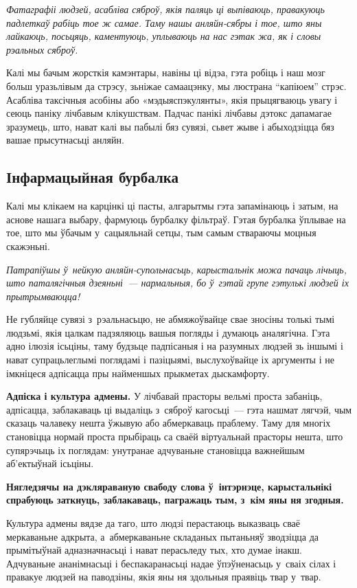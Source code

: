 \emph{Фатаграфіі людзей, асабліва сяброў, якія паляць ці выпіваюць, правакуюць падлеткаў рабіць тое ж самае. Таму нашы анляйн-сябры і тое, што яны лайкаюць, посьцяць, каментуюць, уплываюць на нас гэтак жа, як і словы рэальных сяброў.}

Калі мы бачым жорсткія камэнтары, навіны ці відэа, гэта робіць і наш мозг больш уразьлівым да стрэсу, зьніжае самаацэнку, мы люстрана ``капіюем'' стрэс. Асабліва таксічныя асобіны або «мэдыяспэкулянты», якія прыцягваюць увагу і сеюць паніку лічбавым клікушствам. Падчас панікі лічбавы дэтокс дапамагае зразумець, што, нават калі вы пабылі бяз сувязі, сьвет жыве і абыходзіцца бяз вашае прысутнасьці анляйн.

\subsection*{Інфармацыйная бурбалка}

Калі мы клікаем на карцінкі ці пасты, алгарытмы гэта запамінаюць і затым, на аснове нашага выбару, фармуюць бурбалку фільтраў. Гэтая бурбалка ўплывае на тое, што мы ўбачым у~сацыяльнай сетцы, тым самым ствараючы моцныя скажэньні.

\emph{Патрапіўшы ў~нейкую анляйн-супольнасьць, карыстальнік можа пачаць лічыць, што паталягічныя дзеяньні~--- нармальныя, бо ў~гэтай групе гэтулькі людзей іх прытрымваюцца!}

Не губляйце сувязі з~рэальнасьцю, не абмяжоўвайце свае зносіны толькі тымі людзьмі, якія цалкам падзяляюць вашыя погляды і думаюць аналягічна. Гэта адно ілюзія ісьціны, таму будзьце падпісаныя і на разумных людзей зь іншымі і нават супрацьлеглымі поглядамі і пазіцыямі, выслухоўвайце іх аргументы і не імкніцеся адпісацца пры найменшых прыкметах дыскамфорту.

\textbf{Адпіска і культура адмены.} У лічбавай прасторы вельмі проста забаніць, адпісацца, заблакаваць ці выдаліць з~сяброў кагосьці~--- гэта нашмат лягчэй, чым сказаць чалавеку нешта ўжывую або абмеркаваць праблему. Таму для многіх становіцца нормай проста прыбіраць са сваёй віртуальнай прасторы нешта, што супярэчыць іх поглядам: унутранае адчуваньне становіцца важнейшым аб'ектыўнай ісьціны.

\textbf{Нягледзячы на дэкляраваную свабоду слова ў~інтэрнэце, карыстальнікі спрабуюць заткнуць, заблакаваць, пагражаць тым, з~кім яны ня згодныя.}

Культура адмены вядзе да таго, што людзі перастаюць выказваць сваё меркаваньне адкрыта, а~абмеркаваньне складаных пытаньняў зводзіцца да прымітыўнай адназначнасьці і нават перасьледу тых, хто думае інакш. Адчуваньне ананімнасьці і беспакаранасьці надае ўпэўненасьць у~сваіх сілах і правакуе людзей на паводзіны, якія яны ня здольныя праявіць твар у~твар.

